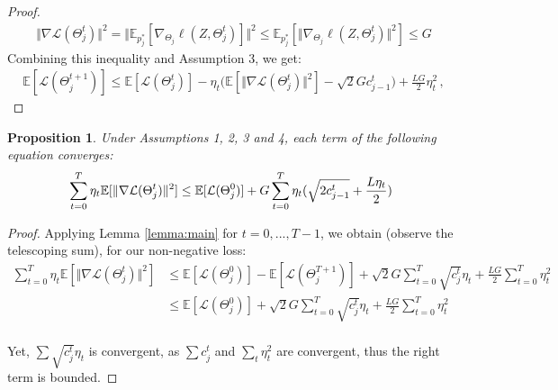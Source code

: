 \documentclass{article}
\newtheorem{prop}{Proposition}[section]
\begin{document}
\begin{proof}
\begin{align}
\Vert \nabla\mathcal{L}(\Theta_j^t)\Vert^2 =\Vert \mathbb{E}_{p^*_j}[\nabla_{\Theta_j} \ell(Z,\Theta_j^t)]\Vert^2\leq \mathbb{E}_{p^*_j}[ \Vert \nabla_{\Theta_j} \ell(Z,\Theta_j^t)\Vert^2]\leq G
\end{align}
Combining this inequality and Assumption 3, we get:
\begin{align*}
\mathbb{E}[\mathcal{L}(\Theta_j^{t+1})]\leq\mathbb{E}[\mathcal{L}(\Theta_j^{t})]-\eta_t\big(\mathbb{E}[\Vert\nabla\mathcal{L}(\Theta_j^t)\Vert^2]-\sqrt{2}Gc^t_{j-1}\big)+\frac{LG}{2}\eta_t^2\,,
\end{align*}

\end{proof}

\begin{prop}
Under Assumptions 1, 2, 3 and 4, each term of the following equation converges:
\begin{align}
\hspace{-0.2cm}
\begin{split}
\sum_{t=0}^T \eta_t
\mathbb{E}[\Vert\nabla\mathcal{L}(\Theta_j^t)\Vert^2] \leq  \mathbb{E}[\mathcal{L}(\Theta^0_j)] +G\sum_{t=0}^T\eta_t(\sqrt{2c_{j-1}^t}+\frac{L\eta_t}{2})
\end{split}
\end{align}
\end{prop}
\begin{proof} Applying Lemma \ref{lemma:main} for $t=0,...,T-1$, we obtain (observe the telescoping sum), for our non-negative loss:
\begin{align}\sum_{t=0}^T \eta_t \mathbb{E}[\Vert\nabla\mathcal{L}(\Theta_j^t)\Vert^2]& \leq  \mathbb{E}[\mathcal{L}(\Theta^0_j)]-\mathbb{E}[\mathcal{L}(\Theta^{T+1}_j)] +\sqrt 2G\sum_{t=0}^T\sqrt{c_j^t}\eta_t +\frac{LG}{2}\sum_{t=0}^T \eta_t^2\\
&\leq \mathbb{E}[\mathcal{L}(\Theta^0_j)] +\sqrt 2G\sum_{t=0}^T\sqrt{c_j^t}\eta_t +\frac{LG}{2}\sum_{t=0}^T \eta_t^2\\
\end{align}

Yet, $\sum \sqrt{c_j^t}\eta_t$ is convergent, as $\sum c_j^t$  and $\sum_t \eta_t^2$ are convergent, thus the right term is bounded.
\end{proof}


\end{document}
